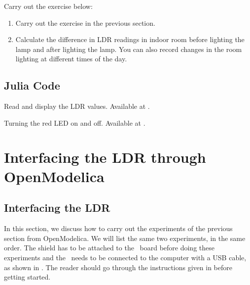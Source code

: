 \begin{exercise}
  Carry out the exercise below:
  \begin{enumerate}
    \item Carry out the exercise in the previous section.
    \item Calculate the difference in LDR readings in indoor room
          before lighting the lamp and after lighting the lamp. You can also
          record changes in the room lighting at different times of the day.
  \end{enumerate}
\end{exercise}

\subsection{Julia Code}
\label{sec:ldr-julia-code}

\begin{juliacode}
  {Read and display the LDR values.  Available at
    .}
  \label{julia:ldr-read}
  
\end{juliacode}

\begin{juliacode}
  {Turning the red LED on and off.  Available at
    .}
  \label{julia:ldr-led}
  
\end{juliacode}

\section{Interfacing the LDR through OpenModelica}
\subsection{Interfacing the LDR}
In this section, we discuss how to carry out the experiments of the
previous section from OpenModelica.  We will list the same two experiments,
in the same order.  The shield has to be attached to the \arduino\ board
before doing these experiments and the \arduino\ needs to be connected to the computer 
with a USB cable, as shown in .
The reader should go through the instructions given in
 before getting started.

